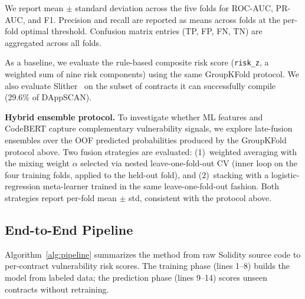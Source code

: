 \documentclass[11pt,a4paper]{article}
\begin{document}
We report mean $\pm$ standard deviation across the five folds for ROC-AUC, PR-AUC, and F1.
Precision and recall are reported as means across folds at the per-fold optimal threshold.
Confusion matrix entries (TP, FP, FN, TN) are aggregated across all folds.

As a baseline, we evaluate the rule-based composite risk score (\texttt{risk\_z}, a weighted sum of nine risk components) using the same GroupKFold protocol.
We also evaluate Slither~\cite{feist2019slither} on the subset of contracts it can successfully compile (29.6\% of DAppSCAN).

\textbf{Hybrid ensemble protocol.}
To investigate whether ML features and CodeBERT capture complementary vulnerability signals, we explore late-fusion ensembles over the OOF predicted probabilities produced by the GroupKFold protocol above.
Two fusion strategies are evaluated: (1)~weighted averaging with the mixing weight $\alpha$ selected via nested leave-one-fold-out CV (inner loop on the four training folds, applied to the held-out fold), and (2)~stacking with a logistic-regression meta-learner trained in the same leave-one-fold-out fashion.
Both strategies report per-fold mean $\pm$ std, consistent with the protocol above.

\subsection{End-to-End Pipeline}

Algorithm~\ref{alg:pipeline} summarizes the method from raw Solidity source code to per-contract vulnerability risk scores.
The training phase (lines 1--8) builds the model from labeled data; the prediction phase (lines 9--14) scores unseen contracts without retraining.
\end{document}
